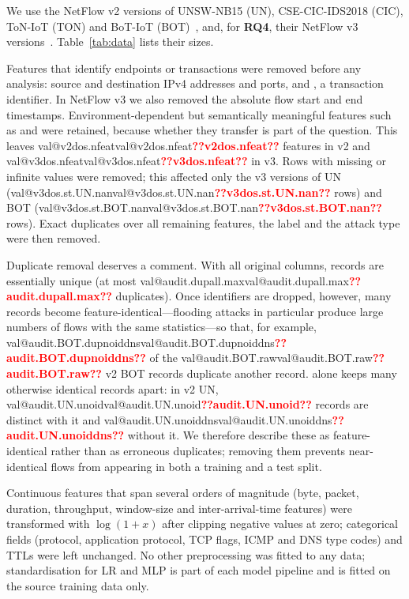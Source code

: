 \documentclass[preprint,12pt]{elsarticle}
\makeatletter
\newcommand{\val}[1]{\ifcsname val@#1\endcsname\csname val@#1\endcsname\else\textbf{\textcolor{red}{??#1??}}\fi}
\newcommand{\feat}[1]{\texttt{\detokenize{#1}}}
\newcommand{\net}[1]{\textsc{#1}}
\newcommand{\RQ}[1]{\textbf{RQ#1}}
\makeatother
\begin{document}
We use the NetFlow v2 versions of UNSW-NB15 (\net{UN}), CSE-CIC-IDS2018 (\net{CIC}), ToN-IoT (\net{TON}) and BoT-IoT (\net{BOT})~\cite{sarhan2022standard}, and, for \RQ{4}, their NetFlow v3 versions~\cite{luay2025temporal}. Table~\ref{tab:data} lists their sizes.

Features that identify endpoints or transactions were removed before any analysis: source and destination IPv4 addresses and ports, and \feat{DNS_QUERY_ID}, a transaction identifier. In NetFlow v3 we also removed the absolute flow start and end timestamps. Environment-dependent but semantically meaningful features such as \feat{MIN_TTL} and \feat{MAX_TTL} were retained, because whether they transfer is part of the question. This leaves \val{v2dos.nfeat} features in v2 and \val{v3dos.nfeat} in v3. Rows with missing or infinite values were removed; this affected only the v3 versions of \net{UN} (\val{v3dos.st.UN.nan} rows) and \net{BOT} (\val{v3dos.st.BOT.nan} rows). Exact duplicates over all remaining features, the label and the attack type were then removed.

Duplicate removal deserves a comment. With all original columns, records are essentially unique (at most \val{audit.dupall.max} duplicates). Once identifiers are dropped, however, many records become feature-identical---flooding attacks in particular produce large numbers of flows with the same statistics---so that, for example, \val{audit.BOT.dupnoiddns} of the \val{audit.BOT.raw} v2 \net{BOT} records duplicate another record. \feat{DNS_QUERY_ID} alone keeps many otherwise identical records apart: in v2 \net{UN}, \val{audit.UN.unoid} records are distinct with it and \val{audit.UN.unoiddns} without it. We therefore describe these as feature-identical rather than as erroneous duplicates; removing them prevents near-identical flows from appearing in both a training and a test split.

Continuous features that span several orders of magnitude (byte, packet, duration, throughput, window-size and inter-arrival-time features) were transformed with $\log(1+x)$ after clipping negative values at zero; categorical fields (protocol, application protocol, TCP flags, ICMP and DNS type codes) and TTLs were left unchanged. No other preprocessing was fitted to any data; standardisation for LR and MLP is part of each model pipeline and is fitted on the source training data only.
\end{document}
